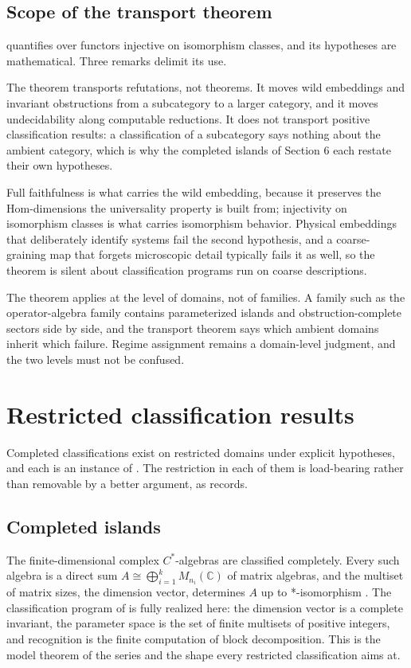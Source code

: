 \documentclass[11pt,letterpaper]{article}
\theoremstyle{definition}
\theoremstyle{remark}
\begin{document}
\subsection{Scope of the transport theorem}

 quantifies over functors injective on isomorphism classes, and its hypotheses are mathematical. Three remarks delimit its use.

The theorem transports refutations, not theorems. It moves wild embeddings and invariant obstructions from a subcategory to a larger category, and it moves undecidability along computable reductions. It does not transport positive classification results: a classification of a subcategory says nothing about the ambient category, which is why the completed islands of Section 6 each restate their own hypotheses.

Full faithfulness is what carries the wild embedding, because it preserves the Hom-dimensions the universality property is built from; injectivity on isomorphism classes is what carries isomorphism behavior. Physical embeddings that deliberately identify systems fail the second hypothesis, and a coarse-graining map that forgets microscopic detail typically fails it as well, so the theorem is silent about classification programs run on coarse descriptions.

The theorem applies at the level of domains, not of families. A family such as the operator-algebra family contains parameterized islands and obstruction-complete sectors side by side, and the transport theorem says which ambient domains inherit which failure. Regime assignment remains a domain-level judgment, and the two levels must not be confused.

\section{Restricted classification results}

Completed classifications exist on restricted domains under explicit hypotheses, and each is an instance of . The restriction in each of them is load-bearing rather than removable by a better argument, as  records.

\subsection{Completed islands}
\label{sec:completed}

The finite-dimensional complex $C^*$-algebras are classified completely. Every such algebra is a direct sum $A \cong \bigoplus_{i=1}^{k} M_{n_i}(\mathbb{C})$ of matrix algebras, and the multiset of matrix sizes, the dimension vector, determines $A$ up to *-isomorphism \cite{cstarwiki}. The classification program of  is fully realized here: the dimension vector is a complete invariant, the parameter space is the set of finite multisets of positive integers, and recognition is the finite computation of block decomposition. This is the model theorem of the series and the shape every restricted classification aims at.
\end{document}
